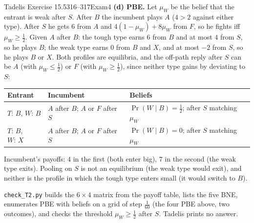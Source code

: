 \begin{exsol}{Tadelis Exercise 15.5}{316--317}{Exam}{4}
\textbf{(d) PBE.} Let $\mu_W$ be the belief that the entrant is weak after $S$. After $B$ the
incumbent plays $A$ ($4 > 2$ against either type). After $S$ he gets $6$ from $A$ and
$4(1-\mu_W) + 8\mu_W$ from $F$, so he fights iff $\mu_W \ge \frac12$. Given $A$ after $B$:
the tough type earns $6$ from $B$ and at most $4$ from $S$, so he plays $B$; the weak type earns
$0$ from $B$ and $X$, and at most $-2$ from $S$, so he plays $B$ or $X$. Both profiles are
equilibria, and the off-path reply after $S$ can be $A$ (with $\mu_W \le \frac12$) or $F$ (with
$\mu_W \ge \frac12$), since neither type gains by deviating to $S$:
\begin{center}
\begin{tabular}{lll}
\toprule
Entrant & Incumbent & Beliefs \\
\midrule
$T{:}\,B$, $W{:}\,B$ & $A$ after $B$; $A$ or $F$ after $S$ & $\Pr(W \mid B) = \frac12$; after $S$ matching $\mu_W$ \\
$T{:}\,B$, $W{:}\,X$ & $A$ after $B$; $A$ or $F$ after $S$ & $\Pr(W \mid B) = 0$; after $S$ matching $\mu_W$ \\
\bottomrule
\end{tabular}
\end{center}
Incumbent's payoffs: $4$ in the first (both enter big), $7$ in the second (the weak type exits).
Pooling on $S$ is not an equilibrium (the weak type would exit), and neither is the profile in which
the tough type enters small (it would switch to $B$).

\verify \texttt{check\_T2.py} builds the $6 \times 4$ matrix from the payoff table, lists the five
BNE, enumerates PBE with beliefs on a grid of step $\frac1{60}$ (the four PBE above, two outcomes), and
checks the threshold $\mu_W \ge \frac12$ after $S$. Tadelis prints no answer.

\end{exsol}
